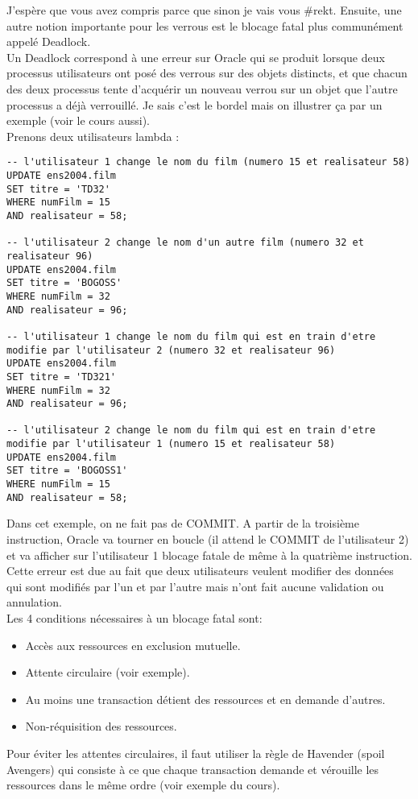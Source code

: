 \documentclass{report}
\begin{document}
J'espère que vous avez compris parce que sinon je vais vous \#rekt. Ensuite, une autre notion importante pour les verrous est le blocage fatal plus communément appelé Deadlock.\\
Un Deadlock correspond à une erreur sur Oracle qui se produit lorsque deux processus utilisateurs ont posé des verrous sur des objets distincts, et que chacun des deux processus tente d'acquérir un nouveau verrou sur un objet que l'autre processus a déjà verrouillé. Je sais c'est le bordel mais on illustrer ça par un exemple (voir le cours aussi).\\
Prenons deux utilisateurs lambda :
\begin{lstlisting}[style=MySQLStyle]
-- l'utilisateur 1 change le nom du film (numero 15 et realisateur 58)
UPDATE ens2004.film
SET titre = 'TD32'
WHERE numFilm = 15
AND realisateur = 58;

-- l'utilisateur 2 change le nom d'un autre film (numero 32 et realisateur 96)
UPDATE ens2004.film
SET titre = 'BOGOSS'
WHERE numFilm = 32
AND realisateur = 96;

-- l'utilisateur 1 change le nom du film qui est en train d'etre modifie par l'utilisateur 2 (numero 32 et realisateur 96)
UPDATE ens2004.film
SET titre = 'TD321'
WHERE numFilm = 32
AND realisateur = 96;

-- l'utilisateur 2 change le nom du film qui est en train d'etre modifie par l'utilisateur 1 (numero 15 et realisateur 58)
UPDATE ens2004.film
SET titre = 'BOGOSS1'
WHERE numFilm = 15
AND realisateur = 58;
\end{lstlisting}

Dans cet exemple, on ne fait pas de COMMIT. A partir de la troisième instruction, Oracle va tourner en boucle (il attend le COMMIT de l'utilisateur 2) et va afficher sur l'utilisateur 1 blocage fatale de même à la quatrième instruction.
Cette erreur est due au fait que deux utilisateurs veulent modifier des données qui sont modifiés par l'un et par l'autre mais n'ont fait aucune validation ou annulation.\\
Les 4 conditions nécessaires à un blocage fatal sont:
\begin{itemize}
\item Accès aux ressources en exclusion mutuelle.
\item Attente circulaire (voir exemple).
\item Au moins une transaction détient des ressources et en demande d'autres.
\item Non-réquisition des ressources.\\
\end{itemize}
Pour éviter les attentes circulaires, il faut utiliser la règle de Havender (spoil Avengers) qui consiste à ce que chaque transaction demande et vérouille les ressources dans le même ordre (voir exemple du cours).
\end{document}
